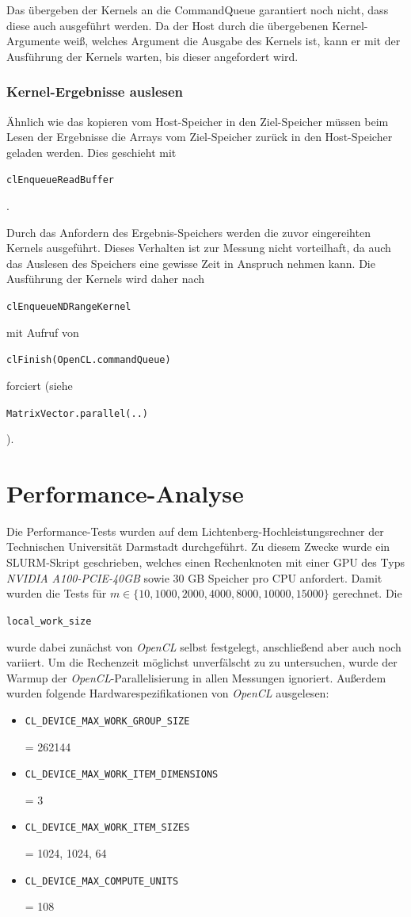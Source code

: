 \documentclass[
	ngerman,
	ruledheaders=section,
	class=report,
	thesis={type=Dokumentation},
	ignore-missing-data=true,
	accentcolor=9c,
	custommargins=false,
	marginpar=false,
	parskip=half-,
	fontsize=11pt,
]{tudapub}
\let\code\texttt
\def\code#1{\begin{small}\texttt{#1}\end{small}}
\begin{document}
Das übergeben der Kernels an die CommandQueue garantiert noch nicht, dass diese auch ausgeführt werden. Da der Host durch die übergebenen Kernel-Argumente weiß, welches Argument die Ausgabe des Kernels ist, kann er mit der Ausführung der Kernels warten, bis dieser angefordert wird.

\subsection*{Kernel-Ergebnisse auslesen}
Ähnlich wie das kopieren vom Host-Speicher in den Ziel-Speicher müssen beim Lesen der Ergebnisse die Arrays vom Ziel-Speicher zurück in den Host-Speicher geladen werden. Dies geschieht mit \code{clEnqueueReadBuffer}.

Durch das Anfordern des Ergebnis-Speichers werden die zuvor eingereihten Kernels ausgeführt. Dieses Verhalten ist zur Messung nicht vorteilhaft, da auch das Auslesen des Speichers eine gewisse Zeit in Anspruch nehmen kann. Die Ausführung der Kernels wird daher nach \code{clEnqueueNDRangeKernel} mit Aufruf von \code{clFinish(OpenCL.commandQueue)} forciert (siehe \code{MatrixVector.parallel(..)}).

\chapter{Performance-Analyse}
Die Performance-Tests wurden auf dem Lichtenberg-Hochleistungsrechner der Technischen Universität Darmstadt durchgeführt. Zu diesem Zwecke wurde ein SLURM-Skript geschrieben, welches einen Rechenknoten mit einer GPU des Typs \textit{NVIDIA A100-PCIE-40GB} sowie 30 GB Speicher pro CPU anfordert. Damit wurden die Tests für $m \in \{10, 1000, 2000, 4000, 8000, 10000, 15000\}$ gerechnet. Die \code{local\_work\_size} wurde dabei zunächst von \textit{OpenCL} selbst festgelegt, anschließend aber auch noch variiert. Um die Rechenzeit möglichst unverfälscht zu zu untersuchen, wurde der Warmup der \textit{OpenCL}-Parallelisierung in allen Messungen ignoriert. Außerdem wurden folgende Hardwarespezifikationen von \textit{OpenCL} ausgelesen:
\begin{itemize}
	\item \code{CL\_DEVICE\_MAX\_WORK\_GROUP\_SIZE} = 262144
	\item \code{CL\_DEVICE\_MAX\_WORK\_ITEM\_DIMENSIONS} = 3
	\item \code{CL\_DEVICE\_MAX\_WORK\_ITEM\_SIZES} = 1024, 1024, 64
	\item \code{CL\_DEVICE\_MAX\_COMPUTE\_UNITS} = 108
\end{itemize}
\end{document}
